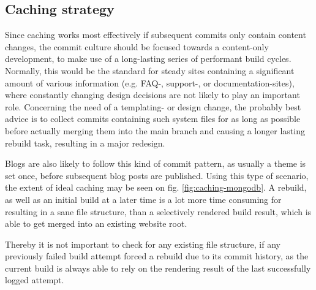 \subsection{Caching strategy}
Since caching works most effectively if subsequent commits only contain content changes, the commit culture should be focused towards a content-only development, to make use of a long-lasting series of performant build cycles. Normally, this would be the standard for steady sites containing a significant amount of various information (e.g. FAQ-, support-, or documentation-sites), where constantly changing design decisions are not likely to play an important role. Concerning the need of a templating- or design change, the probably best advice is to collect commits containing such system files for as long as possible before actually merging them into the main branch and causing a longer lasting rebuild task, resulting in a major redesign.

Blogs are also likely to follow this kind of commit pattern, as usually a theme is set once, before subsequent blog posts are published. Using this type of scenario, the extent of ideal caching may be seen on fig. \ref{fig:caching-mongodb}. A rebuild, as well as an initial build at a later time is a lot more time consuming for resulting in a sane file structure, than a selectively rendered build result, which is able to get merged into an existing website root.

Thereby it is not important to check for any existing file structure, if any previously failed build attempt forced a rebuild due to its commit history, as the current build is always able to rely on the rendering result of the last successfully logged attempt.
